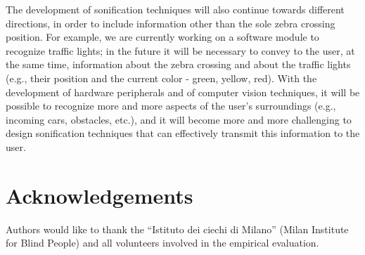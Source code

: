 \documentclass{article}
\begin{document}
The development of sonification techniques will also continue towards different directions, in order to include information other than the sole zebra crossing position. For example, we are currently working on a software module to recognize traffic lights; in the future it will be necessary to convey to the user, at the same time, information about the zebra crossing and about the traffic lights (e.g., their position and the current color - green, yellow, red). With the development of hardware peripherals and of computer vision techniques, it will be possible to recognize more and more aspects of the user's surroundings (e.g., incoming cars, obstacles, etc.), and it will become more and more challenging to design sonification techniques that can effectively transmit this information to the user.

\section{Acknowledgements}
Authors would like to thank the ``Istituto dei ciechi di Milano'' (Milan Institute for Blind People) and all volunteers involved in the empirical evaluation.
\end{document}

